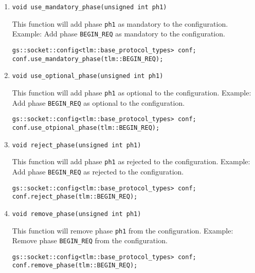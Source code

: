 \documentclass[a4paper,10pt]{article}          %
\begin{document}
\begin{enumerate}
\item 
\verb|void use_mandatory_phase(unsigned int ph1)|

This function will add phase \verb|ph1| as mandatory to the configuration. Example: Add phase \verb|BEGIN_REQ| as mandatory to the configuration.

\begin{small}
\begin{verbatim}
gs::socket::config<tlm::base_protocol_types> conf;
conf.use_mandatory_phase(tlm::BEGIN_REQ);
\end{verbatim}
\end{small}

\item 
\verb|void use_optional_phase(unsigned int ph1)|

This function will add phase \verb|ph1| as optional to the configuration. Example: Add phase \verb|BEGIN_REQ| as optional to the configuration.

\begin{small}
\begin{verbatim}
gs::socket::config<tlm::base_protocol_types> conf;
conf.use_otpional_phase(tlm::BEGIN_REQ);
\end{verbatim}
\end{small}

\item 
\verb|void reject_phase(unsigned int ph1)|

This function will add phase \verb|ph1| as rejected to the configuration. Example: Add phase \verb|BEGIN_REQ| as rejected to the configuration.

\begin{small}
\begin{verbatim}
gs::socket::config<tlm::base_protocol_types> conf;
conf.reject_phase(tlm::BEGIN_REQ);
\end{verbatim}
\end{small}

\item 
\verb|void remove_phase(unsigned int ph1)|

This function will remove phase \verb|ph1| from the configuration. Example: Remove phase \verb|BEGIN_REQ| from the configuration.

\begin{small}
\begin{verbatim}
gs::socket::config<tlm::base_protocol_types> conf;
conf.remove_phase(tlm::BEGIN_REQ);
\end{verbatim}
\end{small}


\end{enumerate}
\end{document}
